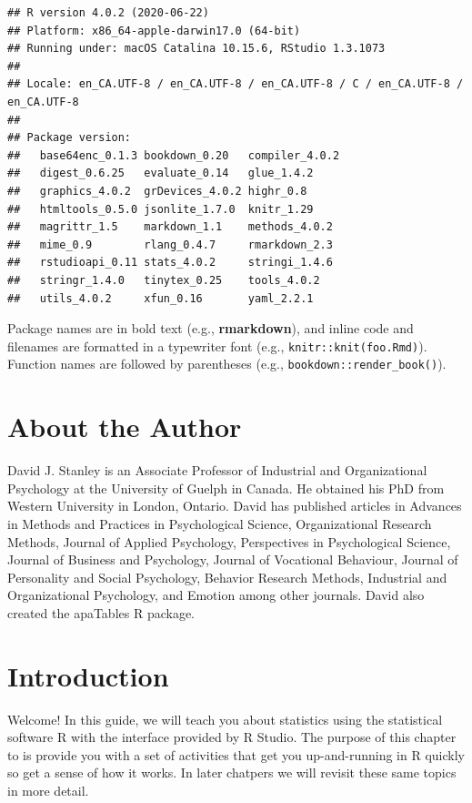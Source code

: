 \documentclass[
]{krantz}
\begin{document}
\begin{verbatim}
## R version 4.0.2 (2020-06-22)
## Platform: x86_64-apple-darwin17.0 (64-bit)
## Running under: macOS Catalina 10.15.6, RStudio 1.3.1073
## 
## Locale: en_CA.UTF-8 / en_CA.UTF-8 / en_CA.UTF-8 / C / en_CA.UTF-8 / en_CA.UTF-8
## 
## Package version:
##   base64enc_0.1.3 bookdown_0.20   compiler_4.0.2 
##   digest_0.6.25   evaluate_0.14   glue_1.4.2     
##   graphics_4.0.2  grDevices_4.0.2 highr_0.8      
##   htmltools_0.5.0 jsonlite_1.7.0  knitr_1.29     
##   magrittr_1.5    markdown_1.1    methods_4.0.2  
##   mime_0.9        rlang_0.4.7     rmarkdown_2.3  
##   rstudioapi_0.11 stats_4.0.2     stringi_1.4.6  
##   stringr_1.4.0   tinytex_0.25    tools_4.0.2    
##   utils_4.0.2     xfun_0.16       yaml_2.2.1
\end{verbatim}

Package names are in bold text (e.g., \textbf{rmarkdown}), and inline code and filenames are formatted in a typewriter font (e.g., \texttt{knitr::knit(\textquotesingle{}foo.Rmd\textquotesingle{})}). Function names are followed by parentheses (e.g., \texttt{bookdown::render\_book()}).

\hypertarget{about-the-author}{%
\chapter*{About the Author}\label{about-the-author}}


David J. Stanley is an Associate Professor of Industrial and Organizational Psychology at the University of Guelph in Canada. He obtained his PhD from Western University in London, Ontario. David has published articles in Advances in Methods and Practices in Psychological Science, Organizational Research Methods, Journal of Applied Psychology, Perspectives in Psychological Science, Journal of Business and Psychology, Journal of Vocational Behaviour, Journal of Personality and Social Psychology, Behavior Research Methods, Industrial and Organizational Psychology, and Emotion among other journals. David also created the apaTables R package.

\mainmatter

\hypertarget{introduction}{%
\chapter{Introduction}\label{introduction}}

Welcome! In this guide, we will teach you about statistics using the statistical software R with the interface provided by R Studio. The purpose of this chapter to is provide you with a set of activities that get you up-and-running in R quickly so get a sense of how it works. In later chatpers we will revisit these same topics in more detail.
\end{document}
